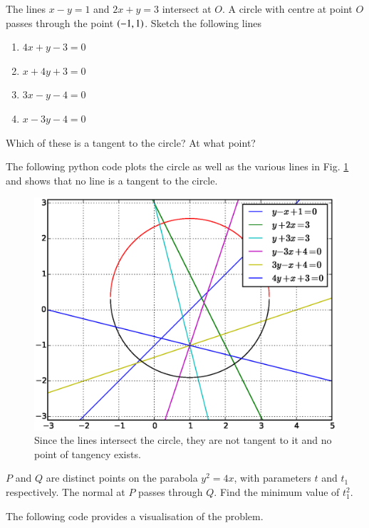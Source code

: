 \documentclass[journal,12pt,twocolumn]{IEEEtran}
\begin{document}
%
\begin{problem}
The lines $x-y=1$ and $2x+y=3$ intersect at $O$.  A circle with centre at point $O$ passes through the point $\left(-1,1\right)$. Sketch the following lines
\begin{enumerate}
\item $4x +y -3 = 0$
\item $x + 4y+3 = 0$
\item $3x - y  - 4 = 0$
\item $x - 3y - 4 = 0$
\end{enumerate}
Which of these is a tangent to the circle? At what point?
\end{problem}
\solution

%
The following python code plots the circle as well as the various lines  in Fig. \ref{fig_22} and shows that no  line is a tangent to the circle.

%
\begin{figure}[h]
\centering
\includegraphics[width=\columnwidth]{./figs/ee16b1022}
\caption{ Since the lines intersect the circle, they are not tangent to it and no point of tangency exists. }
\label{fig_22}	
\end{figure}
%
\begin{problem}
$P$ and $Q$ are distinct points on the parabola $y^2 = 4x$, with parameters $t$ and $t_1$ respectively. The normal at $P$ passes through $Q$.  Find the minimum value of $t_1^2$.
\end{problem}
\solution

The following code provides a visualisation of the problem.

\end{document}
